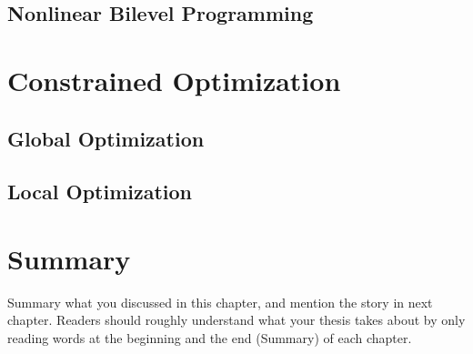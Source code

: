 \subsection{Nonlinear Bilevel Programming}

\section{Constrained Optimization}
\subsection{Global Optimization}
\subsection{Local Optimization}


\section{Summary}
Summary what you discussed in this chapter, and mention the story in next
chapter. Readers should roughly understand what your thesis takes about by only reading
words at the beginning and the end (Summary) of each chapter.



